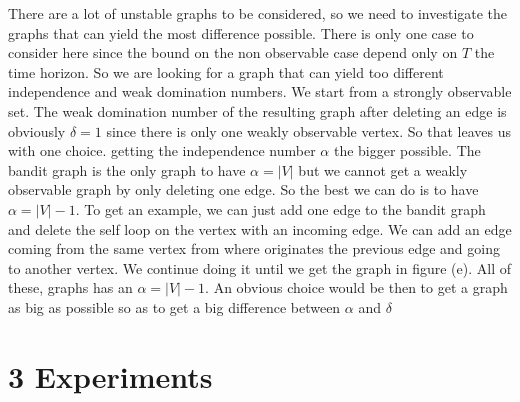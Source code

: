 \documentclass{article} %
\begin{document}
  There are a  lot of unstable graphs to be considered, so we need to investigate the graphs that can yield the most difference possible. There is only one case to consider here since the bound on the non observable case depend only on $T$ the time horizon. So we are looking for a graph that can yield too different independence and weak domination numbers. We start from a strongly observable set. The weak domination number of the resulting graph after deleting an edge is obviously $\delta=1$ since there is only one weakly observable vertex. So that leaves us with one choice. getting the independence number $\alpha$ the bigger possible. The bandit graph is the only graph to have $\alpha =\vert V\vert$ but we cannot get a weakly observable graph by only deleting one edge. So the best we can do is to have $\alpha=\vert V \vert -1$. To get an example, we can just add one edge to the bandit graph and delete the self loop on the vertex with an incoming edge. We can add an edge coming from the same vertex from where originates the previous edge and going to another vertex. We continue doing it until we get the graph in figure (e). All of these, graphs has an $\alpha= \vert V\vert -1$. An obvious choice would be then to get a graph as big as possible so as to get a big difference between $\alpha$ and $\delta$


\newpage
\section*{3 Experiments }




\SetVertexNormal[Shape      = circle,
FillColor  = white,
LineWidth  = 2pt]
\SetUpEdge[lw         = 1.5pt,
color      = black,
labelcolor = white,
labeltext  = red,
labelstyle = {sloped,draw,text=blue}]
\end{document}
